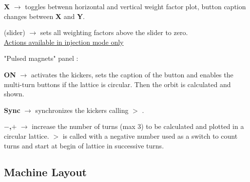 \documentclass[12pt]{article}
\newcommand\code[1]{{\tt #1}}
\newcommand{\ofld}[1]{\colorbox{black!15}{{{\color{black}\bf #1}}}}
\newcommand{\ofldx}[1]{\colorbox{black!15}{{\color{black}(#1)}}}
\newcommand\guico[1]{{\color{blue}\code{#1}}}
\newcommand{\unico}[1]{{\color{burntorange}\code{#1}}}
\newcommand{\evcod}[2]{\ofld{#1} $\rightarrow$ \guico{#2}}
\newcommand{\evcodx}[2]{\ofldx{#1} $\rightarrow$ \guico{#2}}
\newcommand{\prcod}[2]{\opauni{#1}$>$\unico{#2}}
\newcommand{\opagui}[1]{\colorbox{blue!20}{{\color{black}\code{#1}}}}
\newcommand{\oguih}[2]{\subsection{\label{#2}#1}{\Huge\opagui{#2}}\\}
\newcommand{\opauni}[1]{\colorbox{orange!30}{{\color{black}\code{#1}}}}
\begin{document}
\evcod{X}{butOcoWplotClick} toggles betwenn horizontal and vertical weight factor plot, button caption changes between \ofld{X} and \ofld{Y}.

\evcodx{slider}{sliderWChange} sets all weighting factors above the slider to zero.\\[1ex]



\underline{Actions available in injection mode only}

"Pulsed magnets" panel \guico{pankick}:

\evcod{ON}{butKickClick} activates the kickers, sets the caption of the button and enables the multi-turn buttons if the lattice is circular. Then the orbit is calculated and shown.

\evcod{Sync}{butSyncClick} synchronizes the kickers calling \prcod{georblib}{SyncKickers} .

\evcod{$-$,$+$}{butKickT(m,p)Click} increase the number of turns (max 3) to be calculated and plotted in a circular lattice. \prcod{linoplib}{OrbitCalc} is called with a negative number used as a switch to count turns and start at begin of lattice in successive turns.

\oguih{Machine Layout}{opageometry}
\end{document}
